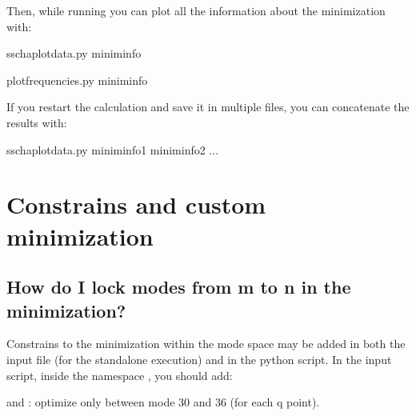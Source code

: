 \documentclass[a4paper,11pt,english]{sphinxmanual}
\begin{document}
\sphinxAtStartPar
Then, while running you can plot all the information about the minimization with:

\begin{sphinxVerbatim}[commandchars=\\\{\}]
sscha\PYGZhy{}plot\PYGZhy{}data.py minim\PYGZus{}info


\end{sphinxVerbatim}

\begin{sphinxVerbatim}[commandchars=\\\{\}]
plot\PYGZus{}frequencies.py minim\PYGZus{}info
\end{sphinxVerbatim}

\sphinxAtStartPar
If you restart the calculation and save it in multiple files, you can concatenate the results with:

\begin{sphinxVerbatim}[commandchars=\\\{\}]
sscha\PYGZhy{}plot\PYGZhy{}data.py minim\PYGZus{}info1 minim\PYGZus{}info2 ...
\end{sphinxVerbatim}


\section{Constrains and custom minimization}
\label{\detokenize{faq:constrains-and-custom-minimization}}

\subsection{How do I lock modes from m to n in the minimization?}
\label{\detokenize{faq:how-do-i-lock-modes-from-m-to-n-in-the-minimization}}
\sphinxAtStartPar
Constrains to the minimization within the mode space may be added in both the input file (for the stand\sphinxhyphen{}alone execution) and in the python script.
In the input script, inside the namespace , you should add:

\sphinxAtStartPar
{} and  : optimize only between mode 30 and 36 (for each q point).
\end{document}
